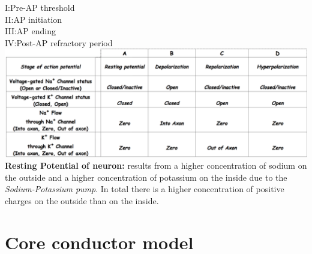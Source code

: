 \documentclass[9pt]{article}
\begin{document}
\begin{multicols}{2}
		I:Pre-AP threshold\\
		II:AP initiation\\
		III:AP ending\\
		IV:Post-AP refractory period\\
\includegraphics[width=0.8\linewidth]{Something/Images/sodium_potassium_gates.png}\\
		\textbf{Resting Potential of neuron: }results from a higher concentration of sodium on the outside and a higher concentration of potassium on the inside due to the \emph{Sodium-Potassium pump}. In total there is a higher concentration of positive charges on the outside than on the inside.\\
					
		\section{Core conductor model}


\end{multicols}
\end{document}
